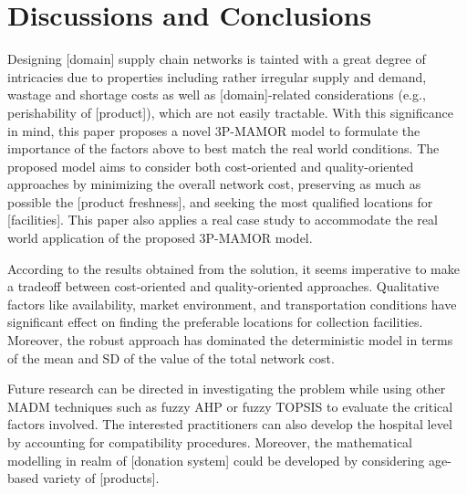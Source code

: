 \documentclass[10pt,twocolumn]{article}
\begin{document}
\section{Discussions and Conclusions}

Designing [domain] supply chain networks is tainted with a great
degree of intricacies due to properties including rather irregular
supply and demand, wastage and shortage costs as well as
[domain]-related considerations (e.g., perishability of [product]),
which are not easily tractable. With this significance in mind, this
paper proposes a novel 3P-MAMOR model to formulate the importance of
the factors above to best match the real world conditions. The
proposed model aims to consider both cost-oriented and
quality-oriented approaches by minimizing the overall network cost,
preserving as much as possible the [product freshness], and seeking
the most qualified locations for [facilities]. This paper also
applies a real case study to accommodate the real world application
of the proposed 3P-MAMOR model.

According to the results obtained from the solution, it seems
imperative to make a tradeoff between cost-oriented and
quality-oriented approaches. Qualitative factors like availability,
market environment, and transportation conditions have significant
effect on finding the preferable locations for collection facilities.
Moreover, the robust approach has dominated the deterministic model
in terms of the mean and SD of the value of the total network cost.

Future research can be directed in investigating the problem while
using other MADM techniques such as fuzzy AHP or fuzzy TOPSIS to
evaluate the critical factors involved. The interested practitioners
can also develop the hospital level by accounting for compatibility
procedures. Moreover, the mathematical modelling in realm of
[donation system] could be developed by considering age-based
variety of [products].

\end{document}
